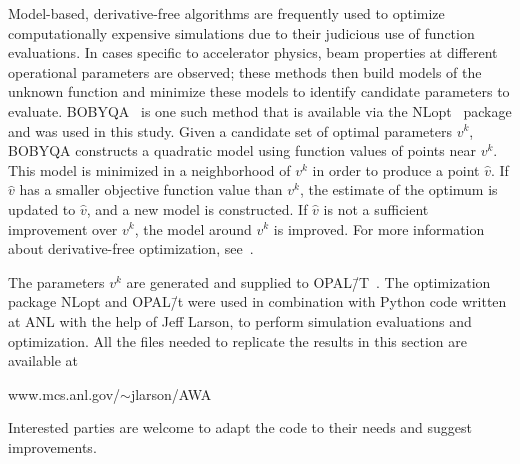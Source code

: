 Model-based, derivative-free algorithms are frequently used to optimize
computationally expensive simulations due to their judicious use of function
evaluations. In cases specific to accelerator physics, 
beam properties at different operational parameters are observed;
these methods then build models of the unknown
function and minimize these models to identify candidate parameters to 
evaluate. BOBYQA~\cite{bobyqa} is one such method that is available via the
NLopt~\cite{nlopt} package and was used in this study. 
Given a candidate set of optimal parameters $v^k$, BOBYQA
constructs a quadratic model using function values of points near $v^k$. 
This model is minimized in a neighborhood of $v^k$ in order to produce a point $\hat{v}$. If $\hat{v}$ has a smaller objective function value than $v^k$, 
the estimate of the optimum is updated to $\hat{v}$, and a new model is constructed. 
If $\hat{v}$ is not a sufficient improvement over $v^k$, 
the model around $v^k$ is improved. For more
information about derivative-free optimization, see~\cite{Conn2009a}.

The parameters $v^k$ are generated and supplied to OPAL\=/T~\cite{opal}. 
The optimization package NLopt and OPAL\=/t were used
in combination with Python code written at ANL with the help 
of Jeff Larson, to perform simulation evaluations and optimization.
All the files needed to replicate the results in this section are available at
\begin{center}
	www.mcs.anl.gov/$\sim$jlarson/AWA
\end{center}
Interested parties are welcome to adapt the code to their needs
and suggest improvements.


